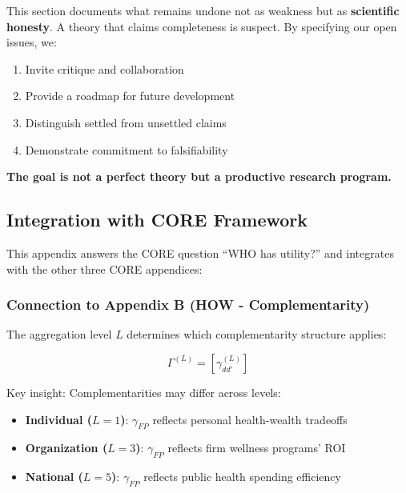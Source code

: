 \begin{tcolorbox}[colback=blue!5!white, colframe=blue!75!black, title=Commitment to Scientific Integrity]
This section documents what remains undone not as weakness but as \textbf{scientific 
honesty}. A theory that claims completeness is suspect. By specifying our open 
issues, we:
\begin{enumerate}[nosep]
\item Invite critique and collaboration
\item Provide a roadmap for future development
\item Distinguish settled from unsettled claims
\item Demonstrate commitment to falsifiability
\end{enumerate}

\textbf{The goal is not a perfect theory but a productive research program.}
\end{tcolorbox}




\subsection{Integration with CORE Framework}
\label{sec:AAA-core-integration}

This appendix answers the CORE question ``WHO has utility?'' and integrates 
with the other three CORE appendices:

\subsubsection{Connection to Appendix B (HOW - Complementarity)}

The aggregation level $L$ determines which complementarity structure applies:

\begin{equation}
\Gamma^{(L)} = [\gamma_{dd'}^{(L)}]
\end{equation}

Key insight: Complementarities may differ across levels:
\begin{itemize}
    \item \textbf{Individual ($L=1$)}: $\gamma_{FP}$ reflects personal health-wealth tradeoffs
    \item \textbf{Organization ($L=3$)}: $\gamma_{FP}$ reflects firm wellness programs' ROI
    \item \textbf{National ($L=5$)}: $\gamma_{FP}$ reflects public health spending efficiency
\end{itemize}

